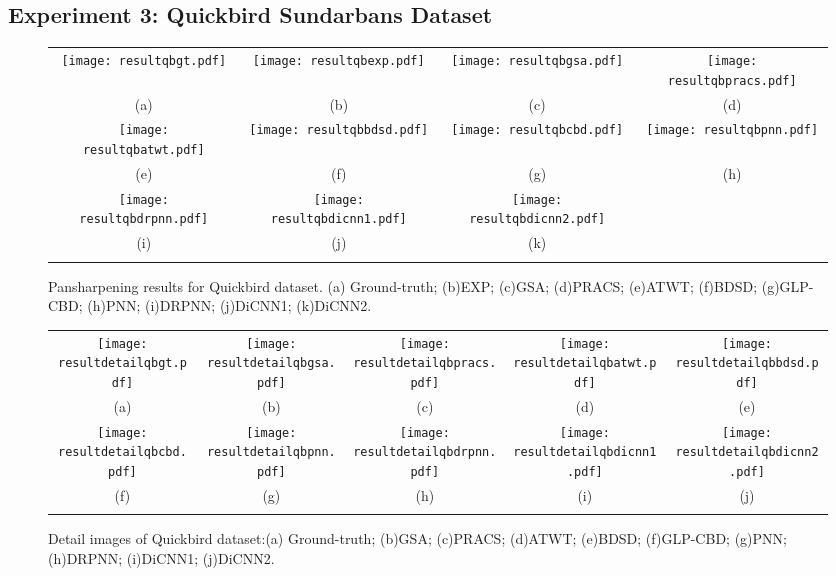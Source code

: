 \documentclass[journal]{IEEEtran}
\begin{document}
\subsection{Experiment 3: Quickbird Sundarbans Dataset}

\begin{figure*}[t]\scriptsize
\centering
  \begin{tabular}{cccc}
\texttt{[image: resultqbgt.pdf]} &
\texttt{[image: resultqbexp.pdf]} &
\texttt{[image: resultqbgsa.pdf]} &
\texttt{[image: resultqbpracs.pdf]} \\
(a) & (b) & (c)  & (d) \\
\texttt{[image: resultqbatwt.pdf]}&
\texttt{[image: resultqbbdsd.pdf]} &
\texttt{[image: resultqbcbd.pdf]} &
\texttt{[image: resultqbpnn.pdf]}  \\
 (e) & (f) & (g) & (h) \\
\texttt{[image: resultqbdrpnn.pdf]} &
\texttt{[image: resultqbdicnn1.pdf]} &
\texttt{[image: resultqbdicnn2.pdf]} \\
 (i) & (j) & (k)  \\
\\
\end{tabular}
\caption{Pansharpening results for Quickbird dataset. (a) Ground-truth; (b)EXP; (c)GSA; (d)PRACS; (e)ATWT; (f)BDSD;  (g)GLP-CBD; (h)PNN; (i)DRPNN; (j)DiCNN1; (k)DiCNN2.}
\label{figure:map:qb}
\end{figure*}

\begin{figure*}[t]\scriptsize
\centering
  \begin{tabular}{ccccc}
\texttt{[image: resultdetailqbgt.pdf]} &
\texttt{[image: resultdetailqbgsa.pdf]} &
\texttt{[image: resultdetailqbpracs.pdf]} &
\texttt{[image: resultdetailqbatwt.pdf]}&
\texttt{[image: resultdetailqbbdsd.pdf]} \\
(a) & (b) & (c)  & (d) &  (e)\\
\texttt{[image: resultdetailqbcbd.pdf]} &
\texttt{[image: resultdetailqbpnn.pdf]} &
\texttt{[image: resultdetailqbdrpnn.pdf]} &
\texttt{[image: resultdetailqbdicnn1.pdf]} &
\texttt{[image: resultdetailqbdicnn2.pdf]} \\
  (f) & (g) & (h) &  (i) & (j)  \\
\\
\end{tabular}
\caption{Detail images of Quickbird dataset:(a) Ground-truth;  (b)GSA; (c)PRACS; (d)ATWT; (e)BDSD;  (f)GLP-CBD; (g)PNN; (h)DRPNN; (i)DiCNN1; (j)DiCNN2. }
\label{figure:detail qb}
\end{figure*}
\end{document}
